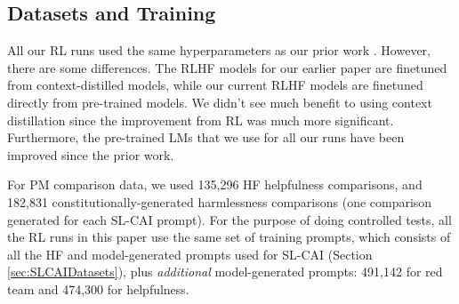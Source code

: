 \documentclass[english]{article}
\renewcommand\>{\rangle}
\begin{document}



\subsection{Datasets and Training}

All our RL runs used the same hyperparameters as our prior work \cite{bai2022training}. However, there are some differences. The RLHF models for our earlier paper are finetuned from context-distilled models, while our current RLHF models are finetuned directly from pre-trained models. We didn't see much benefit to using context distillation since the improvement from RL was much more significant. Furthermore, the pre-trained LMs that we use for all our runs have been improved since the prior work.

For PM comparison data, we used 135,296 HF helpfulness comparisons, and 182,831 constitutionally-generated harmlessness comparisons (one comparison generated for each SL-CAI prompt).
For the purpose of doing controlled tests, all the RL runs in this paper use the same set of training prompts, which consists of all the HF and model-generated prompts used for SL-CAI (Section \ref{sec:SLCAIDatasets}), plus {\it additional} model-generated prompts: 491,142 for red team and 474,300 for helpfulness. 
\end{document}
